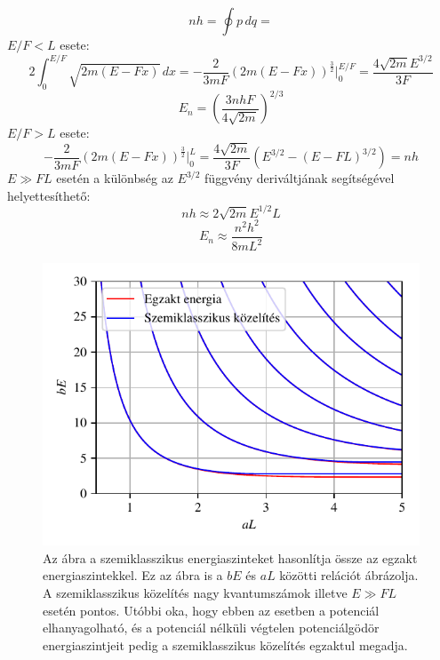 \begin{equation}
		nh = \oint p \, dq = 
	\end{equation}
	$E/F < L$ esete:
	\begin{equation}
		2\int_0^{E/F}\sqrt{2m\left( E-Fx \right)}\,dx = -\frac{2}{3mF}\left(2m\left( E-Fx \right)\right)^{\frac{3}{2}}\bigg \rvert_0^{E/F} = \frac{4\sqrt{2m}E^{3/2}}{3F}
	\end{equation}
	\begin{equation}
		E_n = \left(\frac{3nhF}{4\sqrt{2m}}\right)^{2/3}
	\end{equation}
	$E/F > L$ esete:
	\begin{equation}
		-\frac{2}{3mF}\left(2m\left( E-Fx \right)\right)^{\frac{3}{2}}\bigg \rvert_0^{L} = \frac{4\sqrt{2m}}{3F}\left(E^{3/2} - \left(E - FL\right)^{3/2}\right) = nh
	\end{equation}
	$E \gg FL$ esetén a különbség az $E^{3/2}$ függvény deriváltjának segítségével helyettesíthető:
	\begin{equation}
		nh \approx 2\sqrt{2m}E^{1/2}L
	\end{equation}
	\begin{equation}
		E_n \approx \frac{n^2h^2}{8mL^2}
	\end{equation}
	
	\begin{figure}[H]
		\centering
		\includegraphics[scale=1]{./figs/energiaszintkozelites.pdf}
		\caption[Szemiklasszikus energiaszintek]{Az ábra a szemiklasszikus energiaszinteket hasonlítja össze az egzakt energiaszintekkel. Ez az ábra is a $bE$ és $aL$ közötti relációt ábrázolja. A szemiklasszikus közelítés nagy kvantumszámok illetve $E \gg FL$ esetén pontos. Utóbbi oka, hogy ebben az esetben a potenciál elhanyagolható, és a potenciál nélküli végtelen potenciálgödör energiaszintjeit pedig a szemiklasszikus közelítés egzaktul megadja.}
	\end{figure}
	
